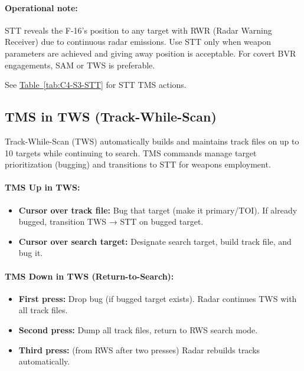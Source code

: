 \documentclass[11pt, a4paper, twoside]{report}
\newcommand{\tabref}[1]{\hyperref[#1]{Table~\ref*{#1}}}
\begin{document}
\paragraph{Operational note:}
STT reveals the F-16's position to any target with RWR (Radar Warning Receiver) due to continuous radar emissions. Use STT only when weapon parameters are achieved and giving away position is acceptable. For covert BVR engagements, SAM or TWS is preferable.

See \tabref{tab:C4-S3-STT} for STT TMS actions.

\subsection{TMS in TWS (Track-While-Scan)}
\label{sec:C4-S3-S3}

Track-While-Scan (TWS) automatically builds and maintains track files on up to 10 targets while continuing to search. TMS commands manage target prioritization (bugging) and transitions to STT for weapons employment.

\paragraph{TMS Up in TWS:}
\begin{itemize}
    \item \textbf{Cursor over track file:} Bug that target (make it primary/TOI). If already bugged, transition TWS → STT on bugged target.
    \item \textbf{Cursor over search target:} Designate search target, build track file, and bug it.
\end{itemize}

\paragraph{TMS Down in TWS (Return-to-Search):}
\begin{itemize}
    \item \textbf{First press:} Drop bug (if bugged target exists). Radar continues TWS with all track files.
    \item \textbf{Second press:} Dump all track files, return to RWS search mode.
    \item \textbf{Third press:} (from RWS after two presses) Radar rebuilds tracks automatically.
\end{itemize}
\end{document}
